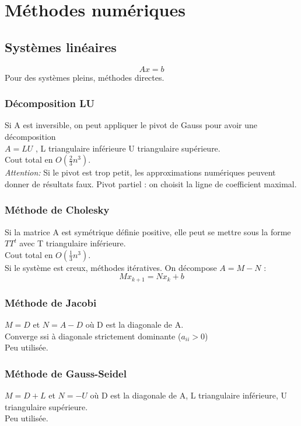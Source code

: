 \documentclass[12pt]{report}
\begin{document}
\chapter{M\'ethodes num\'eriques}
\section{Syst\`emes lin\'eaires}
$$Ax = b$$
Pour des syst\`emes pleins, m\'ethodes directes.
\subsection{D\'ecomposition LU}
Si A est inversible, on peut appliquer le pivot de Gauss pour avoir une
d\'ecomposition \\
$A = LU$ , L triangulaire inf\'erieure
U triangulaire sup\'erieure.\\
Cout total en $O(\frac{2}{3}n^3)$.\\
\textit{Attention: } Si le pivot est trop petit, les approximations num\'eriques
peuvent donner de r\'esultats faux. Pivot partiel : on choisit la ligne de
coefficient maximal.

\subsection{M\'ethode de Cholesky}
Si la matrice A est sym\'etrique d\'efinie positive, elle peut se mettre sous la
forme $T T^t$ avec T triangulaire inf\'erieure.\\
Cout total en $O(\frac{1}{3}n^3)$.\\

Si le syst\`eme est creux, m\'ethodes it\'eratives. On d\'ecompose $A=M-N$ :
$$M x_{k+1} = N x_k + b$$

\subsection{M\'ethode de Jacobi}
$M=D$ et $N=A-D$ o\`u D est la diagonale de A.\\
Converge ssi \`a diagonale strictement dominante ($a_{ii} > 0$)\\
Peu utilis\'ee.

\subsection{M\'ethode de Gauss-Seidel}
$M=D+L$ et $N=-U$ o\`u D est la diagonale de A, L triangulaire inf\'erieure, U
triangulaire sup\'erieure.\\
Peu utilis\'ee.
\end{document}
